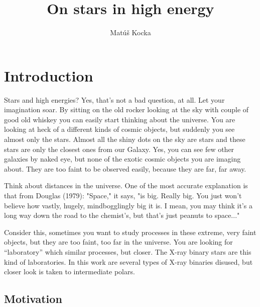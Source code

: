 \documentclass[oneside,a4paper,11pt]{report}
\title{On stars in high energy }
\author{Matúš Kocka}
\begin{document}




\pagebreak
\tableofcontents

\chapter{Introduction}

Stars and high energies? Yes, that's not a bad question, at all. Let your imagination soar. 
By sitting on the old rocker looking at the sky with couple of good old whiskey you can easily 
start thinking about the universe. You are looking at heck of a different kinds of cosmic 
objects, but suddenly you see almost only the stars. Almost all the shiny dots on the sky are 
stars and these stars are only the closest ones from our Galaxy. Yes, you can see few other 
galaxies by naked eye, but none of the exotic cosmic objects you are imaging about. 
They are too faint to be observed easily, because they are far, far away. 

Think about distances in the universe. One of the most accurate explanation is that from 
Douglas (1979):  "Space," it says, "is big. Really big. You just won't believe how vastly, 
hugely, mindbogglingly big it is. I mean, you may think it's a long way down the road to the 
chemist's, but that's just peanuts to space..." \cite{hitch:1}

Consider this, sometimes you want to study processes in these extreme, very faint objects, 
but they are too faint, too far in the universe. You are looking for “laboratory” which similar
 processes, but closer. The X-ray binary stars are this kind of laboratories. In this work are
 several types of X-ray binaries disused, but closer look is taken to intermediate polars. 
\section{Motivation}
\end{document}
